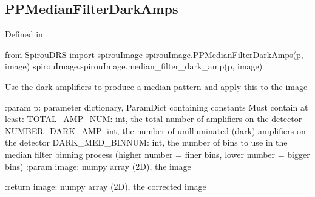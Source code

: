 \noindent\begin{minipage}{\textwidth}
\subsection{PPMedianFilterDarkAmps}

Defined in \spirouImage{}

\begin{pythonbox}
from SpirouDRS import spirouImage
spirouImage.PPMedianFilterDarkAmps(p, image)
spirouImage.spirouImage.median_filter_dark_amp(p, image)
\end{pythonbox}

\begin{pythondocstring}
Use the dark amplifiers to produce a median pattern and apply this to the
image

:param p: parameter dictionary, ParamDict containing constants
        Must contain at least:
            TOTAL_AMP_NUM: int, the total number of amplifiers on the
                           detector
            NUMBER_DARK_AMP: int, the number of unilluminated (dark)
                             amplifiers on the detector
            DARK_MED_BINNUM: int, the number of bins to use in the median
                             filter binning process (higher number = finer
                             bins, lower number = bigger bins)
:param image: numpy array (2D), the image

:return image: numpy array (2D), the corrected image
\end{pythondocstring}
\end{minipage}



